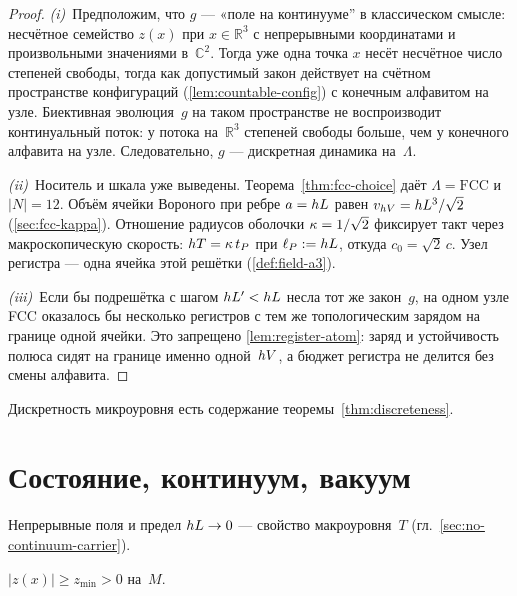 \begin{proof}
\emph{(i)}~Предположим, что $g$ --- «поле на континууме'' в классическом смысле:
несчётное семейство $z(x)$ при $x\in\mathbb{R}^3$ с непрерывными координатами и произвольными
значениями в~$\mathbb{C}^2$.
Тогда уже одна точка $x$ несёт несчётное число степеней свободы, тогда как допустимый закон
действует на счётном пространстве конфигураций (\cref{lem:countable-config}) с конечным алфавитом
на узле.
Биективная эволюция~$g$ на таком пространстве не воспроизводит континуальный поток:
у потока на~$\mathbb{R}^3$ степеней свободы больше, чем у конечного алфавита на узле.
Следовательно, $g$ --- дискретная динамика на~$\Lambda$.

\smallskip
\emph{(ii)}~Носитель и шкала уже выведены.
Теорема~\ref{thm:fcc-choice} даёт $\Lambda=\mathrm{FCC}$ и $|N|=12$.
Объём ячейки Вороного при ребре $a=hL$ равен $v_{hV}=hL^3/\sqrt{2}$ (\cref{sec:fcc-kappa}).
Отношение радиусов оболочки $\kappa=1/\sqrt{2}$ фиксирует такт через макроскопическую скорость: $hT=\kappa\, t_P$ при $\ell_P:=hL$, откуда $c_0=\sqrt{2}\,c$.
Узел регистра --- одна ячейка этой решётки (\cref{def:field-a3}).

\smallskip
\emph{(iii)}~Если бы подрешётка с шагом $hL'<hL$ несла тот же закон~$g$,
на одном узле FCC оказалось бы несколько регистров с тем же топологическим зарядом на границе одной ячейки.
Это запрещено \cref{lem:register-atom}: заряд и устойчивость полюса сидят на границе именно одной~$hV$, а бюджет регистра не делится без смены алфавита.
\end{proof}

\begin{corollary}
\label{cor:discreteness}
Дискретность микроуровня есть содержание теоремы~\ref{thm:discreteness}.
\end{corollary}

\section{Состояние, континуум, вакуум}

\begin{corollary}
\label{cor:no-continuum}
Непрерывные поля и предел $hL\to 0$ --- свойство макроуровня~$T$
(гл.~\ref{sec:no-continuum-carrier}).
\end{corollary}

\begin{corollary}
\label{cor:vacuum-floor}
$|z(x)|\ge z_{\min}>0$ на~$M$.
\end{corollary}

